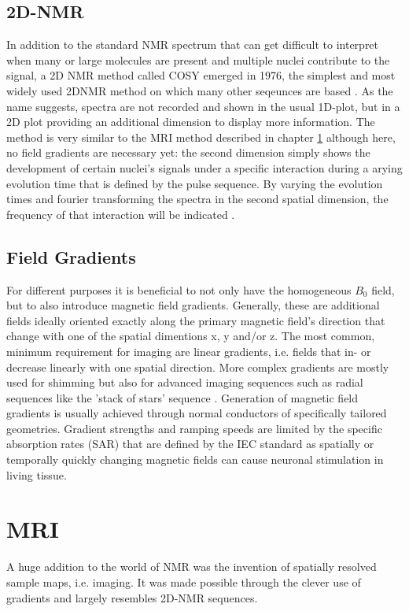         \subsection{2D-NMR}
        \label{chapter:theory:2DNMR}
        In addition to the standard NMR spectrum that can get difficult to interpret when many or large molecules are present and multiple nuclei contribute to the signal, a 2D NMR method called COSY emerged in 1976, the simplest and most widely used 2DNMR method on which many other seqeunces are based  \cite{spie_ad_1982-1}. As the name suggests, spectra are not recorded and shown in the usual 1D-plot, but in a 2D plot providing an additional dimension to display more information. The method is very similar to the MRI method described in chapter \ref{theory:section:MRI} although here, no field gradients are necessary yet: the second dimension simply shows the development of certain nuclei's signals under a specific interaction during a arying evolution time that is defined by the pulse sequence. By varying the evolution times and fourier transforming the spectra in the second spatial dimension, the frequency of that interaction will be indicated \cite{finster_two-dimensional_1980}.
        \subsection{Field Gradients}
            \label{section:theory:magneticGradient}
            For different purposes it is beneficial to not only have the homogeneous $B_0$ field, but to also introduce magnetic field gradients. Generally, these are additional fields ideally oriented exactly along the primary magnetic field's direction that change with one of the spatial dimentions x, y and/or z. The most common, minimum requirement for imaging are linear gradients, i.e. fields that in- or decrease linearly with one spatial direction. More complex gradients \cite{littin_development_2018} are mostly used for shimming \cite{kim_regularized_2002} but also for advanced imaging sequences such as radial sequences like the 'stack of stars' sequence \cite{burdumy_one-second_2016}. Generation of magnetic field gradients is usually achieved through normal conductors of specifically tailored geometries. Gradient strengths and ramping speeds are limited by the specific absorption rates (SAR) that are defined by the IEC standard \cite{noauthor_iec_nodate} as spatially or temporally quickly changing magnetic fields can cause neuronal stimulation in living tissue.
    \section{MRI}
    \label{theory:section:MRI}
        A huge addition to the world of NMR was the invention of spatially resolved sample maps, i.e. imaging. It was made possible through the clever use of gradients and largely resembles 2D-NMR sequences.
